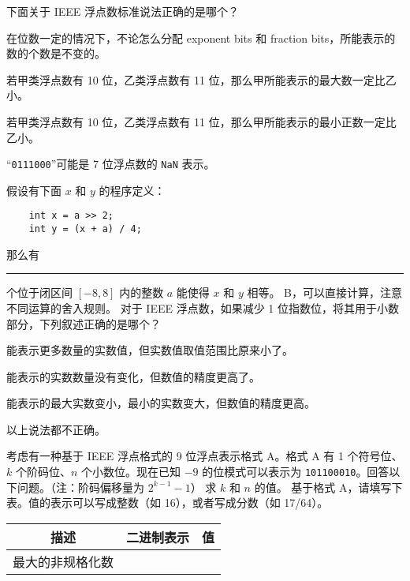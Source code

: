 \begin{problems}
\begin{choices}
        \end{choices}
         下面关于 IEEE 浮点数标准说法正确的是哪个？
        \begin{choices}
            \item 在位数一定的情况下，不论怎么分配 exponent bits 和 fraction bits，所能表示的数的个数是不变的。
            \item 若甲类浮点数有 10 位，乙类浮点数有 11 位，那么甲所能表示的最大数一定比乙小。
            \item 若甲类浮点数有 10 位，乙类浮点数有 11 位，那么甲所能表示的最小正数一定比乙小。
            \item “\texttt{0111000}”可能是 7 位浮点数的 \texttt{NaN} 表示。
        \end{choices}
         假设有下面 $x$ 和 $y$ 的程序定义：
        \begin{verbatim}
    int x = a >> 2;
    int y = (x + a) / 4;
        \end{verbatim}
        那么有 \rule{2.5cm}{0.25mm} 个位于闭区间 $[-8, 8]$ 内的整数 $a$ 能使得 $x$ 和 $y$ 相等。
        \sol B，可以直接计算，注意不同运算的舍入规则。
         对于 IEEE 浮点数，如果减少 1 位指数位，将其用于小数部分，下列叙述正确的是哪个？
        \begin{choices}
            \item 能表示更多数量的实数值，但实数值取值范围比原来小了。
            \item 能表示的实数数量没有变化，但数值的精度更高了。
            \item 能表示的最大实数变小，最小的实数变大，但数值的精度更高。
            \item 以上说法都不正确。
        \end{choices}
         考虑有一种基于 IEEE 浮点格式的 9 位浮点表示格式 A。格式 A 有 1 个符号位、$k$ 个阶码位、$n$ 个小数位。现在已知 $-9$ 的位模式可以表示为 \texttt{101100010}。回答以下问题。（注：阶码偏移量为 $2^{k-1}-1$）
            \qn 求 $k$ 和 $n$ 的值。
            \qn 基于格式 A，请填写下表。值的表示可以写成整数（如 16），或者写成分数（如 17/64）。
            \begin{table}[H]
                \centering
                \begin{tabular}{|c|c|c|}
                    \hline
                    描述 & 二进制表示 & 值 \\ \hline
                    最大的非规格化数 & {\qquad \qquad} & {\qquad \qquad} \\ \hline

\end{tabular}
\end{table}
\end{problems}
